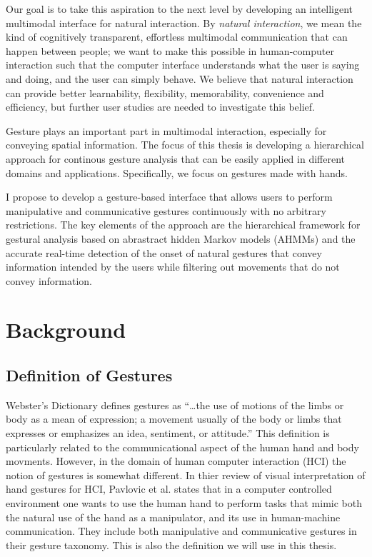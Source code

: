Our goal is to take this aspiration to the next level by developing an
intelligent multimodal interface for natural interaction. By \textit{natural
interaction}, we mean the kind of cognitively transparent, effortless multimodal
communication that can happen between people; we want to make this possible in
human-computer interaction such that the computer interface understands what the
user is saying and doing, and the user can simply behave. We believe that
natural interaction can provide better learnability, flexibility, memorability,
convenience and efficiency, but further user studies are needed to investigate
this belief.

Gesture plays an important part in multimodal interaction, especially for
conveying spatial information. The focus of this thesis is developing a
hierarchical approach for continous gesture analysis that can be easily
applied in different domains and applications. Specifically, we focus on
gestures made with hands. 

I propose to develop a gesture-based interface that allows users to perform
manipulative and communicative gestures continuously with no arbitrary
restrictions. The key elements of the approach are the hierarchical framework
for gestural analysis based on abrastract hidden Markov models (AHMMs) and the
accurate real-time detection of the onset of natural gestures that convey 
information intended by the users while filtering out movements that do not 
convey information.

\section{Background}
\subsection{Definition of Gestures}
Webster's Dictionary defines gestures as ``\ldots the use of motions of the
limbs or body as a mean of expression; a movement usually of the body or limbs
that expresses or emphasizes an idea, sentiment, or attitude.'' This definition
is particularly related to the communicational aspect of the human hand and body
movments. However, in the domain of human computer interaction (HCI) the notion
of gestures is somewhat different. In thier review of visual interpretation of hand
gestures for HCI, Pavlovic et al. \cite{Pavlovic97} states that in a computer
controlled environment one wants to use the human hand to perform tasks that
mimic both the natural use of the hand as a manipulator, and its use in
human-machine communication. They include both manipulative and communicative
gestures in their gesture taxonomy. This is also the definition we will use in
this thesis.

